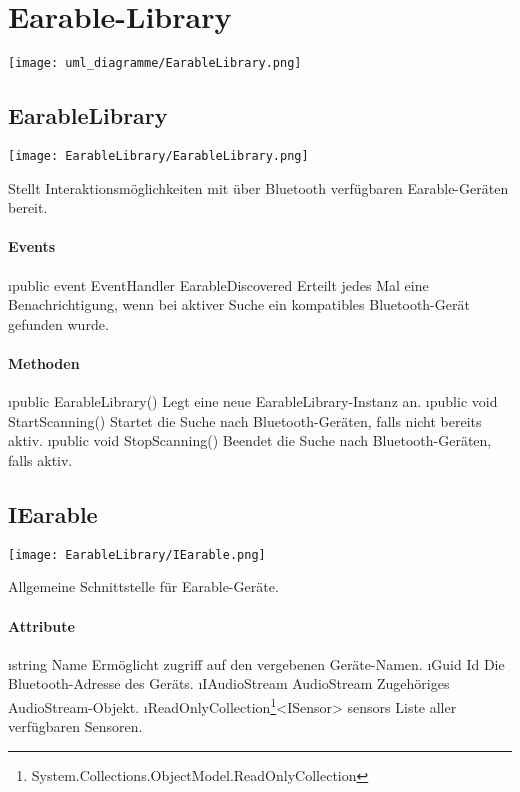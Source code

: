 \documentclass[../entwurf.tex]{subfiles}
\begin{document}
\section{Earable-Library}

\texttt{[image: uml\_diagramme/EarableLibrary.png]}

\subsection{EarableLibrary}
\begin{center}
	\texttt{[image: EarableLibrary/EarableLibrary.png]}
\end{center}
Stellt Interaktionsmöglichkeiten mit über Bluetooth verfügbaren Earable-Geräten bereit.
\paragraph{Events}
\begin{itemize}
	\i{public event EventHandler EarableDiscovered} Erteilt jedes Mal eine Benachrichtigung, wenn bei aktiver Suche ein kompatibles Bluetooth-Gerät gefunden wurde.
\end{itemize}
\paragraph{Methoden}
\begin{itemize}
	\i{public EarableLibrary()} Legt eine neue EarableLibrary-Instanz an.
	\i{public void StartScanning()} Startet die Suche nach Bluetooth-Geräten, falls nicht bereits aktiv.
	\i{public void StopScanning()} Beendet die Suche nach Bluetooth-Geräten, falls aktiv.
\end{itemize}

\subsection{IEarable}
\begin{center}
	\texttt{[image: EarableLibrary/IEarable.png]}
\end{center}
Allgemeine Schnittstelle für Earable-Geräte.
\paragraph{Attribute}
\begin{itemize}
	\i{string Name} Ermöglicht zugriff auf den vergebenen Geräte-Namen.
	\i{Guid Id} Die Bluetooth-Adresse des Geräts.
	\i{IAudioStream AudioStream} Zugehöriges AudioStream-Objekt.
	\i{ReadOnlyCollection\footnote{System.Collections.ObjectModel.ReadOnlyCollection}<ISensor> sensors} Liste aller verfügbaren Sensoren.
\end{itemize}
\end{document}
